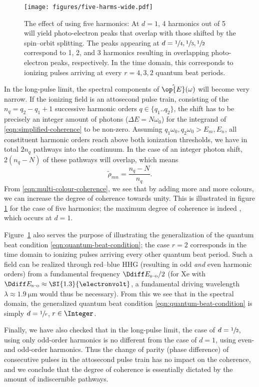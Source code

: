 \begin{figure}[htb]
  \centering
  \texttt{[image: figures/five-harms-wide.pdf]}
  \caption{The effect of using five harmonics: At \(d=1\), 4 harmonics
    out of 5 will yield photo-electron peaks that overlap with those
    shifted by the spin--orbit splitting. The peaks appearing at
    \(d=\sfrac{1}{4},\sfrac{1}{3},\sfrac{1}{2}\) correspond to 1, 2,
    and 3 harmonics resulting in overlapping photo-electron peaks,
    respectively. In the time domain, this corresponds to ionizing
    pulses arriving at every \(r=4,3,2\) quantum beat periods.}
  \label{fig:multiple-harms}
\end{figure}
In the long-pulse limit, the spectral components of
\(\hat{\op{E}}(\omega)\) will become very narrow. If the ionizing field is
an attosecond pulse train, consisting of the \(n_q = q_2-q_1+1\)
successive harmonic orders \(q\in\{q_1..q_2\}\), the shift has to be
precisely an integer amount of photons (\(\Delta E=N\omega_0\)) for the
integrand of \eqref{eqn:simplified-coherence} to be non-zero. Assuming
\(q_1\omega_0, q_2\omega_0>E_m,E_n\), \ie all constituent harmonic orders reach
above both ionization thresholds, we have in total \(2n_q\) pathways
into the continuum. In the case of an integer photon shift,
\(2(n_q-N)\) of these pathways will overlap, which means
\begin{equation}
  \label{eqn:multi-colour-coherence}
  \tilde{\rho}_{mn}=\frac{n_q-N}{n_q}.
\end{equation}
From \eqref{eqn:multi-colour-coherence}, we see that by adding more
and more colours, we can increase the degree of coherence towards
unity. This is illustrated in figure \ref{fig:multiple-harms} for the
case of five harmonics; the maximum degree of coherence is indeed
, which occurs at \(d=1\).

Figure~\ref{fig:multiple-harms} also serves the purpose of
illustrating the generalization of the quantum beat condition
\eqref{eqn:quantum-beat-condition}; \eg the case \(r=2\) corresponds
in the time domain to ionizing pulses arriving every other quantum
beat period. Such a field can be realized through red--blue HHG
(resulting in odd \emph{and} even harmonic orders) from a fundamental
frequency \(\Ddiff E_{\textrm{s--o}}/2\) (for Xe with
\(\Ddiff E_{\textrm{s--o}}\approx\SI{1.3}{\electronvolt}\), a fundamental
driving wavelength \(\lambda\approx\SI{1.9}{\micro\meter}\) would thus be
necessary). From this we see that in the spectral domain, the
generalized quantum beat condition \eqref{eqn:quantum-beat-condition}
is simply \(d=\sfrac{1}{r}\), \(r\in\Integer\).

Finally, we have also checked that in the long-pulse limit, the case
of \(d=\sfrac{1}{2}\), using only odd-order harmonics is no different
from the case of \(d=1\), using even- and odd-order harmonics. Thus
the change of parity (phase difference) of consecutive pulses in the
attosecond pulse train has no impact on the coherence, and we conclude
that the degree of coherence is essentially dictated by the amount of
indiscernible pathways.